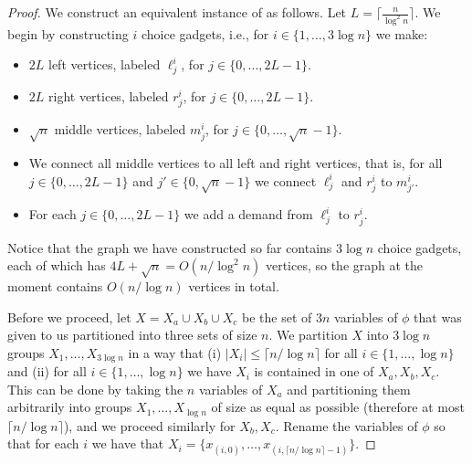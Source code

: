 \begin{proof}
We construct an equivalent instance of \SF as follows. Let
$L=\lceil\frac{n}{\log^2n}\rceil$. We  begin by constructing $i$ choice
gadgets, i.e., for $i\in \{1,\ldots,3\log n\}$ we make:

\begin{itemize}

\item $2L$ left vertices, labeled $\ell^i_j$, for $j\in\{0,\ldots,2L-1\}$.

\item $2L$ right vertices, labeled $r^i_j$, for $j\in\{0,\ldots,2L-1\}$.

\item $\sqrt{n}$ middle vertices, labeled $m^i_j$, for
$j\in\{0,\ldots,\sqrt{n}-1\}$. 

\item We connect all middle vertices to all left and right vertices, that is,
for all $j\in\{0,\ldots,2L-1\}$ and $j'\in\{0,\sqrt{n}-1\}$ we connect
$\ell^i_j$ and $r^i_j$ to $m^i_{j'}$.

\item For each $j\in\{0,\ldots,2L-1\}$ we add a demand from $\ell^i_j$ to
$r^i_j$.

\end{itemize}

Notice that the graph we have constructed so far contains $3\log n$ choice
gadgets, each of which has $4L+\sqrt{n}=O(n/\log^2n)$ vertices, so the graph at
the moment contains $O(n/\log n)$ vertices in total.

Before we proceed, let $X=X_a\cup X_b\cup X_c$ be the set of $3n$ variables of
$\phi$ that was given to us partitioned into three sets of size $n$. We
partition $X$ into $3\log n$ groups $X_1,\ldots,X_{3\log n}$ in a way that (i)
$|X_i|\le \lceil n/\log n\rceil$ for all $i\in\{1,\ldots,\log n\}$ and (ii) for
all $i\in\{1,\ldots,\log n\}$ we have $X_i$ is contained in one of
$X_a,X_b,X_c$. This can be done by taking the $n$ variables of $X_a$ and
partitioning them arbitrarily into groups $X_1,\ldots,X_{\log n}$ of size as
equal as possible (therefore at most $\lceil n/\log n\rceil$), and we proceed
similarly for $X_b,X_c$. Rename the variables of $\phi$ so that for each $i$ we
have that $X_i=\{x_{(i,0)},\ldots,x_{(i,\lceil n/\log n \rceil-1)}\}$.


\end{proof}
